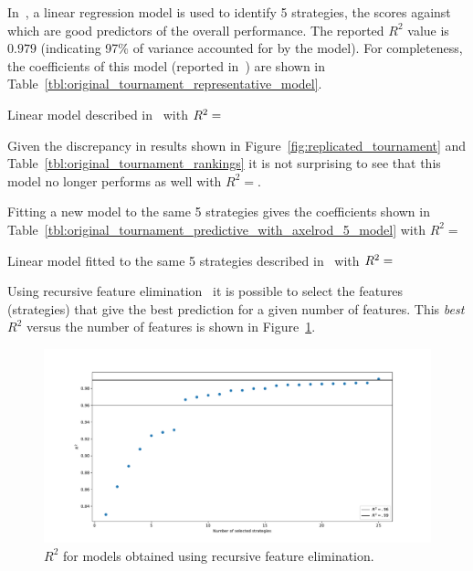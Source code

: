 \documentclass{article}
\begin{document}
In~\cite{Axelrod1980b}, a linear regression model is used to identify 5
strategies, the scores against which are good predictors of the overall
performance. The reported \(R^2\) value is \(0.979\) (indicating 97\% of
variance accounted for by the model). For completeness, the coefficients of
this model (reported in~\cite{Axelrod1980b}) are shown in
Table~\ref{tbl:original_tournament_representative_model}.

\begin{table}[!hbtp]
        \centering
        
        \caption{Linear model described in~\cite{Axelrod1980b} with
             \(R^2=\protect\)}
        \label{tbl:original_tournament_representative_model}
\end{table}

Given the discrepancy in results shown in
Figure~\ref{fig:replicated_tournament} and
Table~\ref{tbl:original_tournament_rankings} it is not surprising to see that
this model no longer performs as well with
\(R^2=\).

Fitting a new model to the same 5 strategies gives the coefficients shown in
Table~\ref{tbl:original_tournament_predictive_with_axelrod_5_model} with
\(R^2=\)

\begin{table}[!hbtp]
        \centering
        
        \caption{Linear model fitted to the same 5 strategies described
                 in~\cite{Axelrod1980b} with
             \(R^2=\protect\)}
        \label{tbl:original_tournament_predictive_with_axelrod_5_model}
\end{table}

Using recursive feature elimination~\cite{guyon2002gene} it is
possible to select the features (strategies) that give the best prediction for
a given number of features. This \textit{best} \(R^2\) versus the number of
features is shown in
Figure~\ref{fig:original_tournament_r_squared_versus_number_of_features}.

\begin{figure}[!hbtp]
    \centering
    \includegraphics[width=.8\textwidth]{assets/original_tournament_r_squared_versus_number_of_features.pdf}
    \caption{\(R^2\) for models obtained using recursive feature elimination.}
    \label{fig:original_tournament_r_squared_versus_number_of_features}
\end{figure}
\end{document}
